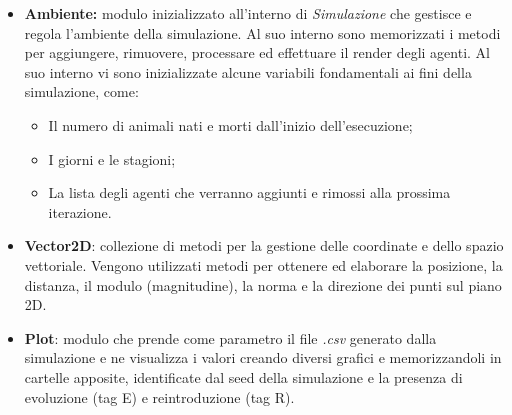\documentclass[11pt]{article}
\begin{document}
\begin{itemize}
\begin{itemize}
    \end{itemize}
    
    \item \textbf{Ambiente:} modulo inizializzato all'interno di \textit{Simulazione} che gestisce e regola l'ambiente della simulazione. Al suo interno sono memorizzati i metodi per aggiungere, rimuovere, processare ed effettuare il render degli agenti. Al suo interno vi sono inizializzate alcune variabili fondamentali ai fini della simulazione, come:
    \begin{itemize}
\item  Il numero di animali nati e morti dall’inizio dell’esecuzione;
\item I giorni e le stagioni;
\item La lista degli agenti che verranno aggiunti e rimossi alla prossima iterazione.
\end{itemize}

    \item \textbf{Vector2D}: collezione di metodi per la gestione delle coordinate e dello spazio vettoriale. Vengono utilizzati metodi per ottenere ed elaborare la posizione, la distanza, il modulo (magnitudine), la norma e la direzione dei punti sul piano 2D.
    
    \item \textbf{Plot}: modulo che prende come parametro il file \textit{.csv} generato dalla simulazione e ne visualizza i valori creando diversi grafici e memorizzandoli in cartelle apposite, identificate dal seed della simulazione e la presenza di evoluzione (tag E) e reintroduzione (tag R).
\end{itemize}
\end{document}
